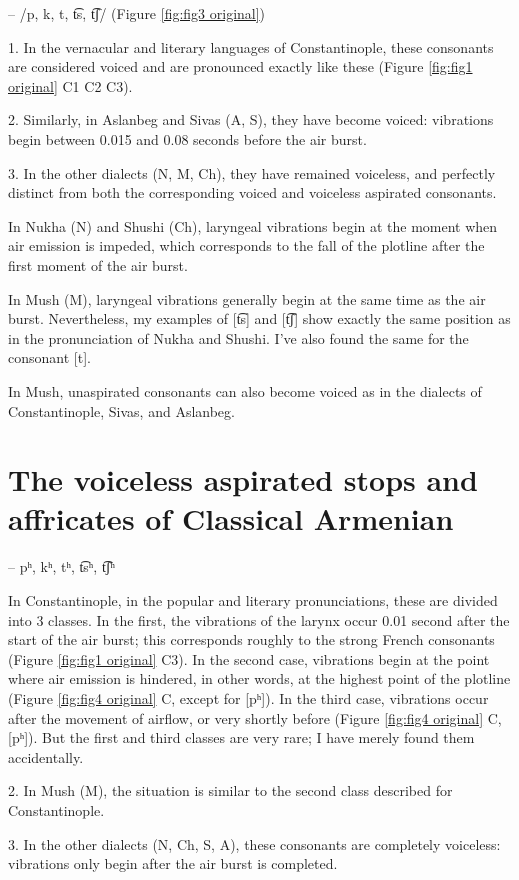  – /p,  k,  t, t͡s,  t͡ʃ/
(Figure \ref{fig:fig3 original})

1. In the vernacular and literary languages of Constantinople, these consonants are considered voiced and are pronounced exactly like these (Figure \ref{fig:fig1 original} C1 C2 C3).

2. Similarly, in Aslanbeg and Sivas (A, S), they have become voiced: vibrations begin between 0.015 and 0.08 seconds before the air burst.

3. In the other dialects (N, M, Ch), they have remained voiceless, and perfectly distinct from both the corresponding voiced and voiceless aspirated consonants.

In Nukha (N) and Shushi (Ch), laryngeal vibrations begin at the moment when air emission is impeded, which corresponds to the fall of the plotline after the first moment of the air burst.

In Mush (M), laryngeal vibrations generally begin at the same time as the air burst. Nevertheless, my examples of [t͡s] and [t͡ʃ] show exactly the same position as in the pronunciation of Nukha and Shushi. I've also found the same for the consonant [t].

In Mush, unaspirated consonants can also become voiced as in the dialects of Constantinople, Sivas, and Aslanbeg.


\section{The  voiceless aspirated stops and affricates of Classical Armenian}

 –  pʰ, kʰ, tʰ,  t͡sʰ,  t͡ʃʰ


In Constantinople, in the popular and literary pronunciations, these are divided into 3 classes. In the first, the vibrations of the larynx occur 0.01 second after the start of the air burst; this corresponds roughly to the strong French consonants (Figure \ref{fig:fig1 original} C3). In the second case, vibrations begin at the point where air emission is hindered, in other words, at the highest point of the plotline (Figure \ref{fig:fig4 original} C, except for [pʰ]). In the third case, vibrations occur after the movement of airflow, or very shortly before (Figure \ref{fig:fig4 original} C, [pʰ]). But the first and third classes are very rare; I have merely found them accidentally.

2. In Mush (M), the situation is similar to the second class described for Constantinople.

3. In the other dialects (N, Ch, S, A), these consonants are completely voiceless: vibrations only begin after the air burst is completed.
	
	
